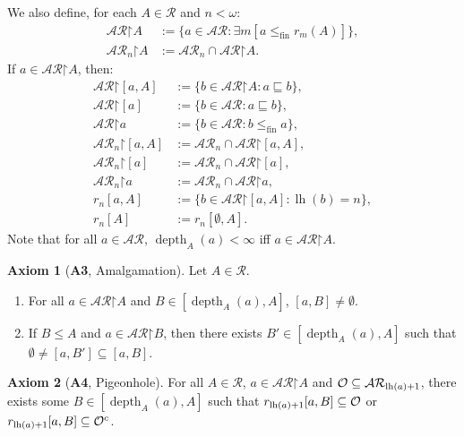 \documentclass[11pt,reqno]{amsart}
\theoremstyle{plain}
\numberwithin{equation}{section}
\theoremstyle{definition}
\newtheorem*{axiom}{Axiom}
\newcommand{\func}{\operatorname}
\newcommand{\cal}{\mathcal}
\newcommand{\restrictedto}{\mathord{\upharpoonright}}
\newcommand{\lh}{\func{lh}}
\newcommand{\depth}{\func{depth}}
\newcommand{\fin}{\mathrm{fin}}
\DeclareRobustCommand{\O}{\ifmmode\cal{O}\else\slashO\fi}
\begin{document}
We also define, for each $A \in \cal{R}$ and $n < \omega$:
\begin{align*}
    \cal{AR}\restrictedto A &:= \{a \in \cal{AR} : \exists m[a \leq_\fin r_m(A)]\}, \\
    \cal{AR}_n\restrictedto A &:= \cal{AR}_n \cap \cal{AR}\restrictedto A.
\end{align*}
If $a \in \cal{AR}\restrictedto A$, then:
\begin{align*}
    \cal{AR}\restrictedto[a,A] &:= \{b \in \cal{AR}\restrictedto A : a \sqsubseteq b\}, \\
    \cal{AR}\restrictedto[a] &:= \{b \in \cal{AR} : a \sqsubseteq b\}, \\
    \cal{AR}\restrictedto a &:= \{b \in \cal{AR} : b \leq_\fin a\},  \\
    \cal{AR}_n\restrictedto[a,A] &:= \cal{AR}_n \cap \cal{AR}\restrictedto[a,A], \\
    \cal{AR}_n\restrictedto[a] &:= \cal{AR}_n \cap \cal{AR}\restrictedto[a], \\
    \cal{AR}_n\restrictedto a &:= \cal{AR}_n \cap \cal{AR}\restrictedto a, \\
    r_n[a,A] &:= \{b \in \cal{AR}\restrictedto[a,A] : \lh(b) = n\}, \\
    r_n[A] &:= r_n[\emptyset,A].
\end{align*}
Note that for all $a \in \cal{AR}$, $\depth_A(a) < \infty$ iff $a \in \cal{AR}\restrictedto A$. 

\begin{axiom}[\textbf{A3}, Amalgamation]
    Let $A \in \cal{R}$.
    \begin{enumerate}[label=(\arabic*)]
        \item For all $a \in \cal{AR}\restrictedto A$ and $B \in [\depth_A(a),A]$, $[a,B] \neq \emptyset$.

        \item If $B \leq A$ and $a \in \cal{AR}\restrictedto B$, then there exists $B' \in [\depth_A(a),A]$ such that $\emptyset \neq [a,B'] \subseteq [a,B]$.
    \end{enumerate}
\end{axiom}

\begin{axiom}[\textbf{A4}, Pigeonhole]
    For all $A \in \cal{R}$, $a \in \cal{AR}\restrictedto A$ and $\O \subseteq \cal{AR}_{\lh(a)+1}$, there exists some $B \in [\depth_A(a),A]$ such that $r_{\lh(a)+1}[a,B] \subseteq \O$ or $r_{\lh(a)+1}[a,B] \subseteq \O^c$.
\end{axiom}
\end{document}
